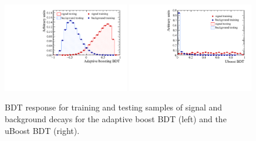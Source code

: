 \begin{figure}[htbp]
   \centering
        \includegraphics[width=0.49\textwidth]{./Figs/Appendix2/Overtainting_BDT.pdf}
        \includegraphics[width=0.49\textwidth]{./Figs/Appendix2/uBoost_overtraining.pdf}

    \caption{BDT response for training and testing samples of signal and background decays for the adaptive boost BDT (left) and the uBoost BDT (right). }
    \label{fig:ELBDTovertrain}
\end{figure}






